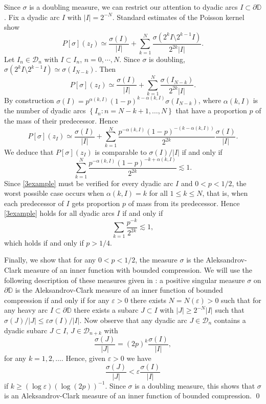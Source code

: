 \documentclass[a4paper,12pt]{article}
\theoremstyle{definition}
\numberwithin{equation}{section}
\newcommand{\D}{\mathbb D}
\begin{document}
Since $\sigma$ is a doubling measure, we can restrict our attention to dyadic arcs $I \subset \partial \D$. Fix a dyadic arc $I$ with $|I| =2^{-N}$. Standard estimates of the Poisson kernel show
$$
P [\sigma] (z_I ) \simeq \frac{\sigma(I)}{|I|}+\sum_{k = 1}^N \frac{\sigma\left(2^{k} I \setminus 2^{k-1} I\right)}{2^{2k}|I|} . 
$$
Let $I_{n} \in \mathcal{D}_n$ with $I \subset I_n$, $n=0, \cdots, N$. Since $\sigma$ is doubling, $\sigma (2^{k} I \setminus 2^{k-1} I) \simeq \sigma (I_{N-k})$. Then   
$$
P [ \sigma] (z_{I} ) \simeq \frac{\sigma(I)}{|I|}+\sum_{k=1}^{N} \frac{\sigma\left(I_{N-k}\right)}{2^{2 k}|I|}. 
$$
By construction $\sigma(I)=p^{\alpha(k, I)}(1-p)^{k-\alpha(k, I)} \sigma\left(I_{N-k}\right)$, where $\alpha(k, I)$ is the number of dyadic arcs $\left\{I_{n}: n=N-k+1, \ldots, N\right\}$ that have a proportion $p$ of the mass of their predecessor. Hence
$$
P [\sigma] (z_{I}) \simeq \frac{\sigma (I)}{|I|}+\sum_{k=1}^{N} \frac{p^{-\alpha(k, I)}{(1-p)}^{-(k-\alpha(k ,  I))}}{2^{2k}}  \frac{\sigma (I)}{|I|}. 
$$
We deduce that $P[\sigma]\left(z_{I}\right)$ is comparable to $ \sigma (I) / |I|$ if and only if
\begin{equation}
    \label{3example}
\sum_{k=1}^{N} \frac{p^{-\alpha(k, I)}(1-p)^{-k+\alpha(k, I)}}{2^{2 k}} \lesssim 1 .
\end{equation}
Since \eqref{3example} must be verified for every dyadic arc $I$ and $0<p<1/2$, the worst possible case occurs when $\alpha(k, I)=k$ for all $1 \leq k \leq N$, that is, when each predecessor of $I$ gets proportion $p$ of mass from its predecessor. Hence \eqref{3example} holds for all dyadic arcs $I$ if and only if
$$
\sum_{k=1} \frac{p^{-k}}{2^{2 k}} \lesssim 1,
$$
which holds if and only if $p>1 / 4$. 

\medskip

Finally, we show that for any $0<p<1 / 2$,  the measure $\sigma$ is the Aleksandrov-Clark measure of an inner function with bounded compression. We will use the following description of these measures given in \cite{ivriinicolau2025}: a positive singular measure $\sigma$ on $\partial \D$ is the Aleksandrov-Clark measure of an inner function of bounded compression if and only if for any $\varepsilon >0$ there exists $N=N(\varepsilon ) >0$ such that for any heavy arc $ I \subset \partial \D $ there exists a subarc $J \subset I$ with $|J| \geq 2^{-N} |I|$ such that $\sigma (J) / |J| \leq \varepsilon \sigma (I) / |I|$. Now observe that any dyadic arc $J \in \mathcal{D}_{n}$ contains a dyadic subarc $J \subset I$, $J \in \mathcal{D}_{n+k}$ with
$$
\frac{\sigma (J)}{|J|}=(2 p)^{k} \frac{\sigma (I)}{|I|}, 
$$
for any $k=1,2,\ldots$. Hence, given $\varepsilon >0$ we have 
$$
\frac{\sigma (J)}{|J|} <\varepsilon \frac{\sigma (I)}{|I|}
$$
if $k \geq (\log \varepsilon)(\log (2p))^{-1}$. Since $\sigma$ is a doubling measure, this shows that $\sigma$ is an Aleksandrov-Clark measure of an inner function of bounded compression.
\qed
\end{document}
